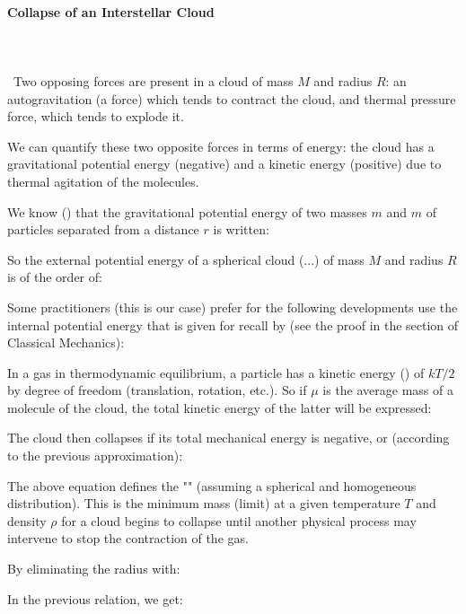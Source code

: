	
	\paragraph{Collapse of an Interstellar Cloud}\mbox{}\\\\\
	Two opposing forces are present in a cloud of mass $M$ and radius $R$: an autogravitation (a force) which tends to contract the cloud, and thermal pressure force, which tends to explode it.
	
	We can quantify these two opposite forces in terms of energy: the cloud has a gravitational potential energy (negative) and a kinetic energy (positive) due to thermal agitation of the molecules.

	We know () that the gravitational potential energy of two masses $m$ and $m$ of particles separated from a distance $r$ is written:
	
	So the external potential energy of a spherical cloud (...) of mass $M$ and radius $R$ is of the order of:
	
	\begin{tcolorbox}[title=Remark,colframe=black,arc=10pt]
	Some practitioners (this is our case) prefer for the following developments use the internal potential energy that is given for recall by (see the proof in the section of Classical Mechanics):
	
	\end{tcolorbox}
	In a gas in thermodynamic equilibrium, a particle has a kinetic energy () of $kT/2$ by degree of freedom (translation, rotation, etc.). So if $\mu$ is the average mass of a molecule of the cloud, the total kinetic energy of the latter will be expressed:
	
	The cloud then collapses if its total mechanical energy is negative, or (according to the previous approximation):
	
	The above equation defines the "" (assuming a spherical and homogeneous distribution). This is the minimum mass (limit) at a given temperature $T$ and density $\rho$ for a cloud begins to collapse until another physical process may intervene to stop the contraction of the gas.
	
	By eliminating the radius with:
	
	In the previous relation, we get:
	
